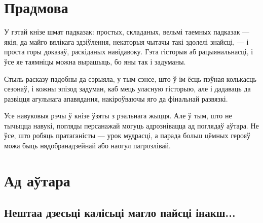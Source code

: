 \chapter*{Прадмова}

У гэтай кнізе шмат падказак: простых, складаных, вельмі таемных падказак ---
якія, да майго вялікага здзіўлення, некаторыя чытачы такі здолелі знайсці, --- і проста
горы доказаў, раскіданых навідавоку. Гэта гісторыя аб рацыянальнасці, і ўсе яе 
таямніцы можна вырашыць, бо яны так і задуманы.

Стыль расказу падобны да сэрыяла, у тым сэнсе, што ў ім ёсць пэўная колькасць
сезонаў, і кожны эпізод задуман, каб мець уласную гісторыю, але і дадаваць 
да развіцця агульнага апавядання, накіроўваючы яго да фінальнай развязкі.

Усе  навуковыя рэчы ў кнізе ўзяты з рэальнага жыцця. Але ў тым, што не тычыцца навукі,
погляды персанажай могуць адрознівацца ад поглядаў аўтара. Не ўсе, што робяць 
пратаганісты --- урок мудрасці, а парада больш цёмных герояў можа быць 
нядобранадзейнай або наогул пагрозлівай.

\chapter*{Ад \enspace аўтара}

\section*{Нештаа дзесьці калісьці магло пайсці інакш...}

